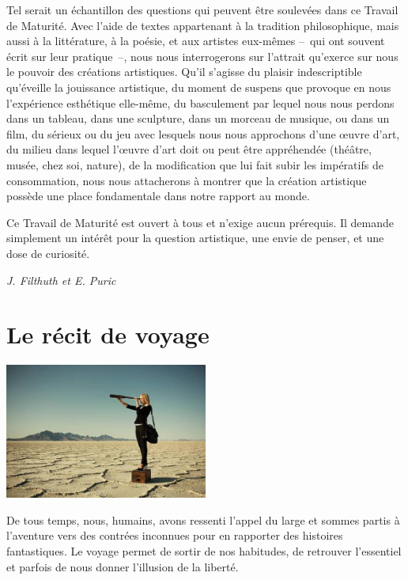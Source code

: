 \documentclass[
  10pt,
  french,
  a5paper,
  openany]{book}
\newenvironment{signature}{\begin{flushright}}{\end{flushright}}
\begin{document}
Tel serait un échantillon des questions qui peuvent être soulevées dans ce Travail de Maturité. Avec l'aide de textes appartenant à la tradition philosophique, mais aussi à la littérature, à la poésie, et aux artistes eux-mêmes --~qui ont souvent écrit sur leur pratique~--, nous nous interrogerons sur l'attrait qu'exerce sur nous le pouvoir des créations artistiques. Qu'il s'agisse du plaisir indescriptible qu'éveille la jouissance artistique, du moment de suspens que provoque en nous l'expérience esthétique elle-même, du basculement par lequel nous nous perdons dans un tableau, dans une sculpture, dans un morceau de musique, ou dans un film, du sérieux ou du jeu avec lesquels nous nous approchons d'une œuvre d'art, du milieu dans lequel l'œuvre d'art doit ou peut être appréhendée (théâtre, musée, chez soi, nature), de la modification que lui fait subir les impératifs de consommation, nous nous attacherons à montrer que la création artistique possède une place fondamentale dans notre rapport au monde.

Ce Travail de Maturité est ouvert à tous et n'exige aucun prérequis. Il demande simplement un intérêt pour la question artistique, une envie de penser, et une dose de curiosité.

\begin{signature}
\emph{J. Filthuth et E. Puric}

\end{signature}

\hypertarget{le-ruxe9cit-de-voyage}{%
\chapter{Le récit de voyage}\label{le-ruxe9cit-de-voyage}}

\begin{center}
\includegraphics[width=\textwidth,height=12em]{images/le-recit-de-voyage.jpg}

\end{center}

De tous temps, nous, humains, avons ressenti l'appel du large et sommes partis à l'aventure vers des contrées inconnues pour en rapporter des histoires fantastiques. Le voyage permet de sortir de nos habitudes, de retrouver l'essentiel et parfois de nous donner l'illusion de la liberté.
\end{document}
